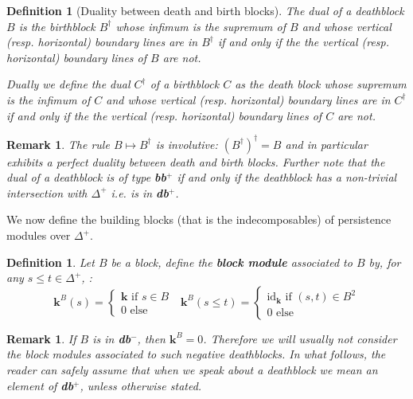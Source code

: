\documentclass[a4paper, english, 11pt]{article}
\newcommand{\kk}[0]{\textbf{k}}
\newcommand{\0}{\vec{0}}
\newtheorem{remark}[prop]{Remark}
\newtheorem{defi}[prop]{Definition}
\begin{document}
\begin{defi}[Duality between death and birth blocks]
 \label{D:dualblocks} The dual  of a deathblock $B$ is the birthblock $B^\dagger$ whose infimum is the supremum of $B$ and whose vertical (resp. horizontal) boundary lines are in $B^\dagger$ if and only if the the vertical (resp. horizontal) boundary lines of $B$ are not. 
 
 Dually we define the dual $C^\dagger$ of a birthblock $C$ as the death block whose supremum is the infimum of $C$ and whose vertical (resp. horizontal) boundary lines are in $C^\dagger$ if and only if the the vertical (resp. horizontal) boundary lines of $C$ are not.
\end{defi}
\begin{remark}
 The rule $B\mapsto B^\dagger$ is involutive: $(B^\dagger)^\dagger=B$ and in particular exhibits a perfect duality between death and birth blocks.  Further note that the dual of a deathblock is of type \textbf{bb}$^{+}$ if and only if the deathblock has a non-trivial intersection with $\Delta^+$ i.e. is in \textbf{db}$^+$. 
\end{remark}


We now define the building blocks (that is the indecomposables) of persistence modules over $\Delta^+$.
\begin{defi}\label{Def:blockmodule}
Let $B$ be a block, define the \textbf{block module} associated to $B$ by, for any $s\leq t \in \Delta^+$, : 
$$\kk^B(s) = \begin{cases} \kk \text{~if~}s\in B \\ 0 \text{~else}
\end{cases} ~~~\kk^B(s\leq t) = \begin{cases} \text{id}_\kk \text{~if~} (s,t)\in B^2 \\ 0 \text{~else} \end{cases} $$
\end{defi}
\begin{remark}\label{R:trivaildbmoins}
 If $B$ is in \textbf{db}$^{-}$, then $\kk^B=0$. Therefore we will usually not consider the block modules associated to such negative deathblocks. In what follows, the reader can safely assume that when we speak about a deathblock  we mean an element of \textbf{db}$^+$, unless otherwise stated.
\end{remark}
\end{document}
